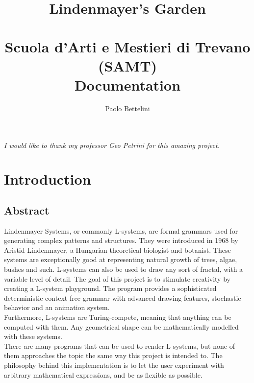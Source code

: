 \documentclass[a4paper]{article}
\title{%
    Lindenmayer's Garden \\
    \phantom{} \\
    \Large Scuola d'Arti e Mestieri di Trevano (SAMT) \\
    \Large Documentation
}
\author{Paolo Bettelini}
\date{}
\begin{document}
\maketitle


\vspace{4.5cm}

\begin{center}
\end{center}

\pagebreak

\begin{center}
    \thispagestyle{empty}
    \vspace*{\fill}
    \textsl{I would like to thank my professor Geo Petrini for this amazing project.}
    \vspace*{\fill}
\end{center}

\pagebreak

\tableofcontents

\pagebreak

\section{Introduction}

\subsection{Abstract}

Lindenmayer Systems, or commonly L-systems,
are formal grammars used for generating complex patterns and structures.
They were introduced in 1968 by Aristid Lindenmayer, a Hungarian theoretical biologist and botanist.
These systems are exceptionally good at representing natural growth of trees, algae, bushes and such.
L-systems can also be used to draw any sort of fractal, with a variable level of detail.
The goal of this project is to stimulate creativity
by creating a L-system playground.
The program provides a sophisticated deterministic context-free grammar
with advanced drawing features, stochastic behavior and an animation system. \\
Furthermore, L-systems are Turing-compete, meaning that anything can be computed
with them.
Any geometrical shape can be mathematically modelled with these systems. \\
There are many programs that can be used to render L-systems, but none of them
approaches the topic the same way this project is intended to.
The philosophy behind this implementation is to let the user experiment
with arbitrary mathematical expressions, and be as flexible as possible.
\end{document}
